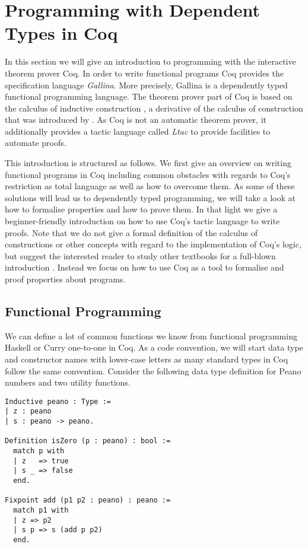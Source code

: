 \section{Programming with Dependent Types in Coq}
\label{sec:progDT}

In this section we will give an introduction to programming with the interactive theorem prover Coq.
In order to write functional programs Coq provides the specification language \emph{Gallina}.
More precisely, Gallina is a dependently typed functional programming language.
The theorem prover part of Coq is based on the calculus of inductive construction \citep{coquand1988inductively}, a derivative of the calculus of construction that was introduced by \citet{coquand1986calculus}.
As Coq is not an automatic theorem prover, it additionally provides a tactic language called \emph{Ltac} to provide facilities to automate proofs.

This introduction is structured as follows.
We first give an overview on writing functional programs in Coq including common obstacles with regards to Coq's restriction as total language as well as how to overcome them.
As some of these solutions will lead us to dependently typed programming, we will take a look at how to formalise properties and how to prove them.
In that light we give a beginner-friendly introduction on how to use Coq's tactic language to write proofs.
Note that we do not give a formal definition of the calculus of constructions or other concepts with regard to the implementation of Coq's logic, but suggest the interested reader to study other textbooks for a full-blown introduction \citep{pierce2010software, chlipala2011certified}.
Instead we focus on how to use Coq as a tool to formalise and proof properties about programs.

\subsection{Functional Programming}

We can define a lot of common functions we know from functional programming Haskell or Curry one-to-one in Coq.
As a code convention, we will start data type and constructor names with lower-case letters as many standard types in Coq follow the same convention.
Consider the following data type definition for Peano numbers and two utility functions.

\begin{verbatim}
Inductive peano : Type :=
| z : peano
| s : peano -> peano.

Definition isZero (p : peano) : bool :=
  match p with
  | z   => true
  | s _ => false
  end.

Fixpoint add (p1 p2 : peano) : peano :=
  match p1 with
  | z => p2
  | s p => s (add p p2)
  end.
\end{verbatim}

